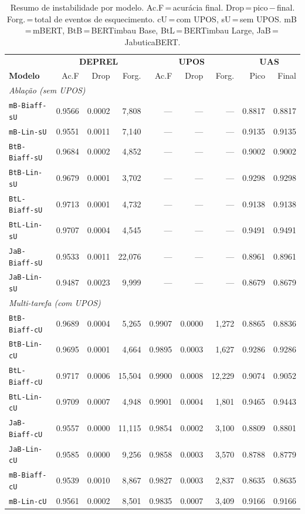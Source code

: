 \begin{table}[ht]
\centering\scriptsize
\setlength{\tabcolsep}{4pt}
\caption{Resumo de instabilidade por modelo. Ac.F\,=\,acurácia final. Drop\,=\,pico\,$-$\,final. Forg.\,=\,total de eventos de esquecimento. cU\,=\,com UPOS, sU\,=\,sem UPOS. mB\,=\,mBERT, BtB\,=\,BERTimbau Base, BtL\,=\,BERTimbau Large, JaB\,=\,JabuticaBERT.}
\label{tab:resumo-instabilidade}
\begin{tabular}{l|rrr|rrr|rr}
\toprule
 & \multicolumn{3}{c|}{\textbf{DEPREL}} & \multicolumn{3}{c|}{\textbf{UPOS}} & \multicolumn{2}{c}{\textbf{UAS}} \\
\textbf{Modelo} & Ac.F & Drop & Forg. & Ac.F & Drop & Forg. & Pico & Final \\
\midrule
\multicolumn{9}{l}{\textit{Ablação (sem UPOS)}} \\
\texttt{mB-Biaff-sU} & 0.9566 & 0.0002 & 7,808 & --- & --- & --- & 0.8817 & 0.8817 \\
\texttt{mB-Lin-sU} & 0.9551 & 0.0011 & 7,140 & --- & --- & --- & 0.9135 & 0.9135 \\
\texttt{BtB-Biaff-sU} & 0.9684 & 0.0002 & 4,852 & --- & --- & --- & 0.9002 & 0.9002 \\
\texttt{BtB-Lin-sU} & 0.9679 & 0.0001 & 3,702 & --- & --- & --- & 0.9298 & 0.9298 \\
\texttt{BtL-Biaff-sU} & 0.9713 & 0.0001 & 4,732 & --- & --- & --- & 0.9138 & 0.9138 \\
\texttt{BtL-Lin-sU} & 0.9707 & 0.0004 & 4,545 & --- & --- & --- & 0.9491 & 0.9491 \\
\texttt{JaB-Biaff-sU} & 0.9533 & 0.0011 & 22,076 & --- & --- & --- & 0.8961 & 0.8961 \\
\texttt{JaB-Lin-sU} & 0.9487 & 0.0023 & 9,999 & --- & --- & --- & 0.8679 & 0.8679 \\
\midrule
\multicolumn{9}{l}{\textit{Multi-tarefa (com UPOS)}} \\
\texttt{BtB-Biaff-cU} & 0.9689 & 0.0004 & 5,265 & 0.9907 & 0.0000 & 1,272 & 0.8865 & 0.8836 \\
\texttt{BtB-Lin-cU} & 0.9695 & 0.0001 & 4,664 & 0.9895 & 0.0003 & 1,627 & 0.9286 & 0.9286 \\
\texttt{BtL-Biaff-cU} & 0.9717 & 0.0006 & 15,504 & 0.9900 & 0.0008 & 12,229 & 0.9074 & 0.9052 \\
\texttt{BtL-Lin-cU} & 0.9709 & 0.0007 & 4,948 & 0.9901 & 0.0004 & 1,801 & 0.9465 & 0.9443 \\
\texttt{JaB-Biaff-cU} & 0.9557 & 0.0000 & 11,115 & 0.9854 & 0.0002 & 3,100 & 0.8809 & 0.8801 \\
\texttt{JaB-Lin-cU} & 0.9585 & 0.0000 & 9,256 & 0.9858 & 0.0003 & 3,570 & 0.8788 & 0.8779 \\
\texttt{mB-Biaff-cU} & 0.9539 & 0.0010 & 8,867 & 0.9827 & 0.0003 & 2,837 & 0.8635 & 0.8635 \\
\texttt{mB-Lin-cU} & 0.9561 & 0.0002 & 8,501 & 0.9835 & 0.0007 & 3,409 & 0.9166 & 0.9166 \\
\bottomrule
\end{tabular}
\end{table}
